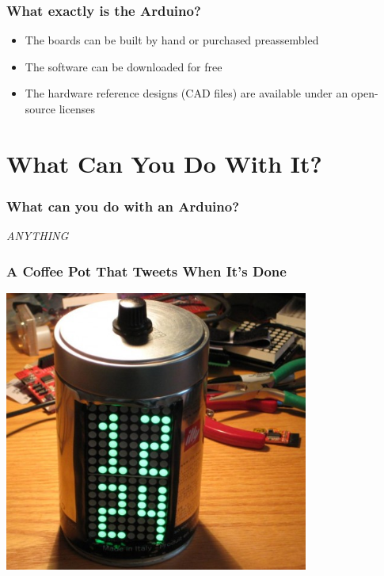 \documentclass[yellow]{beamer}
\begin{document}
\begin{frame}
\frametitle{What exactly is the Arduino?}
\begin{itemize}
	\item<1-> The boards can be built by hand or purchased preassembled 
	\item<2-> The software can be downloaded for free
	\item<3-> The hardware reference designs (CAD files) are available under an open-source licenses
\end{itemize}
\end{frame}

\section{What Can You Do With It?}

\begin{frame}
\frametitle{What can you do with an Arduino?}
\begin{center}
\pause 
\emph{\huge{ANYTHING}}

\end{center}
\end{frame}

\begin{frame}
\frametitle{A Coffee Pot That Tweets When It's Done}
\begin{center}
	\includegraphics[width=0.75\textwidth]{coffee.jpg}
\end{center}
\end{frame}
\end{document}
